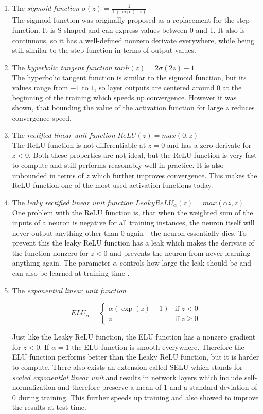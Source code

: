 \begin{enumerate}
  \item The \textit{sigmoid function} $\sigma(z) = \frac{1}{1 + \exp(-z)}$ \\
    The sigmoid function was originally proposed as a replacement for the step function. It is S shaped and can express values between 0 and 1. It also is continuous, so it has a well-defined nonzero derivate everywhere, while being still similar to the step function in terms of output values.
  \item The \textit{hyperbolic tangent function} $tanh(z) = 2\sigma(2z) - 1$ \\
    The hyperbolic tangent function is similar to the sigmoid function, but its values range from $-1$ to $1$, so layer outputs are centered around 0 at the beginning of the training which speeds up convergence. However it was shown, that bounding the value of the activation function for large $z$ reduces convergence speed.
  \item The \textit{rectified linear unit function} $ReLU(z) = max(0, z)$ \\
    The ReLU function is not differentiable at $z=0$ and has a zero derivate for $z < 0$. Both these properties are not ideal, but the ReLU function is very fast to compute and still performs reasonably well in practice. It is also unbounded in terms of $z$ which further improves convergence. This makes the ReLU function one of the most used activation functions today.
  \item The \textit{leaky rectified linear unit function} $LeakyReLU_\alpha(z) = max(\alpha z, z)$ \\
    One problem with the ReLU function is, that when the weighted sum of the inputs of a neuron is negative for all training instances, the neuron itself will never output anything other than 0 again - the neuron essentially dies. To prevent this the leaky ReLU function has a leak which makes the derivate of the function nonzero for $z < 0$ and prevents the neuron from never learning anything again. The parameter $\alpha$ controls how large the leak should be and can also be learned at training time \cite{xu2015empirical}.
  \item The \textit{exponential linear unit function}
  
  \[ELU_\alpha = 
  \begin{cases} 
    \alpha(\exp(z) - 1) & \text{if } z < 0 \\
    z  & \text{if } z \geq 0
  \end{cases} \]

  Just like the Leaky ReLU function, the ELU function has a nonzero gradient for $z < 0$. If $\alpha = 1$ the ELU function is smooth everywhere. Therefore the ELU function performs better than the Leaky ReLU function, but it is harder to compute. \cite{clevert2015fast} There also exists an extension called SELU which stands for \textit{scaled exponential linear unit} \cite{klambauer2017self} and results in network layers which include self-normalization and therefore preserve a mean of 1 and a standard deviation of 0 during training. This further speeds up training and also showed to improve the results at test time.
\end{enumerate}

